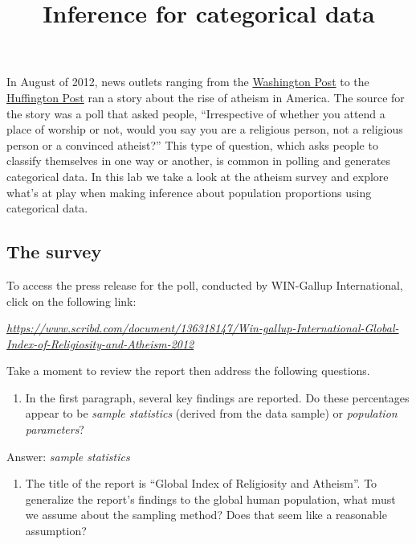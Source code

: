 \documentclass[
]{article}
\title{Inference for categorical data}
\author{}
\date{\vspace{-2.5em}}
\providecommand{\tightlist}{%
  \setlength{\itemsep}{0pt}\setlength{\parskip}{0pt}}
\begin{document}
\maketitle

In August of 2012, news outlets ranging from the
\href{http://www.washingtonpost.com/national/on-faith/poll-shows-atheism-on-the-rise-in-the-us/2012/08/13/90020fd6-e57d-11e1-9739-eef99c5fb285_story.html}{Washington
Post} to the
\href{http://www.huffingtonpost.com/2012/08/14/atheism-rise-religiosity-decline-in-america_n_1777031.html}{Huffington
Post} ran a story about the rise of atheism in America. The source for
the story was a poll that asked people, ``Irrespective of whether you
attend a place of worship or not, would you say you are a religious
person, not a religious person or a convinced atheist?'' This type of
question, which asks people to classify themselves in one way or
another, is common in polling and generates categorical data. In this
lab we take a look at the atheism survey and explore what's at play when
making inference about population proportions using categorical data.

\hypertarget{the-survey}{%
\subsection{The survey}\label{the-survey}}

To access the press release for the poll, conducted by WIN-Gallup
International, click on the following link:

\emph{\url{https://www.scribd.com/document/136318147/Win-gallup-International-Global-Index-of-Religiosity-and-Atheism-2012}}

Take a moment to review the report then address the following questions.

\begin{enumerate}
\def\labelenumi{\arabic{enumi}.}
\tightlist
\item
  In the first paragraph, several key findings are reported. Do these
  percentages appear to be \emph{sample statistics} (derived from the
  data sample) or \emph{population parameters}?
\end{enumerate}

Answer: \emph{sample statistics}

\begin{enumerate}
\def\labelenumi{\arabic{enumi}.}
\setcounter{enumi}{1}
\tightlist
\item
  The title of the report is ``Global Index of Religiosity and
  Atheism''. To generalize the report's findings to the global human
  population, what must we assume about the sampling method? Does that
  seem like a reasonable assumption?
\end{enumerate}
\end{document}
